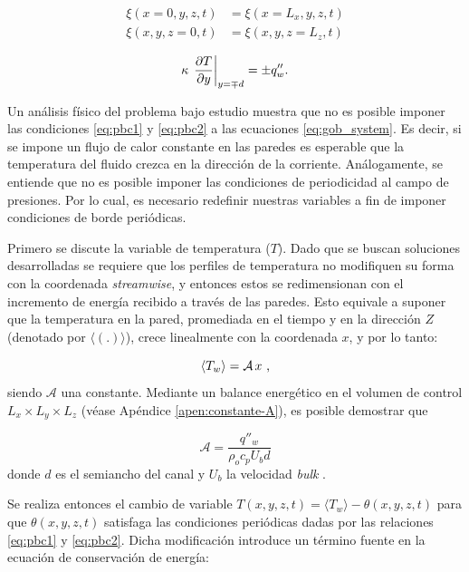 \begin{align}
\xi(x=0,y,z,t) &= \xi(x=L_x,y,z,t)
\label{eq:pbc1} \\
\xi(x,y,z=0,t) &= \xi(x,y,z=L_z,t)
\label{eq:pbc2}
\end{align}

\begin{equation}
\kappa \hspace{0.5mm} \left. \frac{\partial T}{\partial y} \right\vert_{y=\mp d} = \pm q''_w \text{.}
\label{eq:neumann}
\end{equation}



Un análisis físico del problema bajo estudio muestra que no es posible imponer las condiciones \ref{eq:pbc1} y \ref{eq:pbc2} a las ecuaciones \ref{eq:gob_system}. Es decir, si se impone un flujo de calor constante en las paredes es esperable que la temperatura del fluido crezca en la dirección de la corriente. Análogamente, se entiende que no es posible imponer las condiciones de periodicidad al campo de presiones. Por lo cual, es necesario redefinir nuestras variables a fin de imponer condiciones de borde periódicas.

Primero se discute la variable de temperatura ($T$). Dado que se buscan soluciones desarrolladas se requiere que los perfiles de temperatura no modifiquen su forma con la coordenada \textit{streamwise}, y entonces estos se redimensionan con el incremento de energía recibido a través de las paredes. Esto equivale a suponer que la temperatura en la pared, promediada en el tiempo y en la dirección $Z$ (denotado por $\langle (\text{.})\rangle$), crece linealmente con la coordenada $x$, y por lo tanto: 

$$
\langle T_w \rangle = \mathcal{A} \hspace{0.5mm} x \text{ ,}
$$
siendo $\mathcal{A}$ una constante. Mediante un balance energético en el volumen de control $L_x \times L_y \times L_z$ (véase Apéndice \ref{apen:constante-A}), es posible demostrar que

$$\mathcal{A} = \frac{q''_w}{\rho_o  c_p U_b d} $$ 
donde $d$ es el semiancho del canal y $U_b$ la velocidad \textit{bulk} \cite{pope2001turbulent}.

Se realiza entonces el cambio de variable $T(x,y,z,t) = \langle T_w \rangle - \theta(x,y,z,t)$ para que $\theta(x,y,z,t)$ satisfaga las condiciones periódicas dadas por las relaciones \ref{eq:pbc1} y \ref{eq:pbc2}. Dicha modificación introduce un término fuente en la ecuación de conservación de energía:

